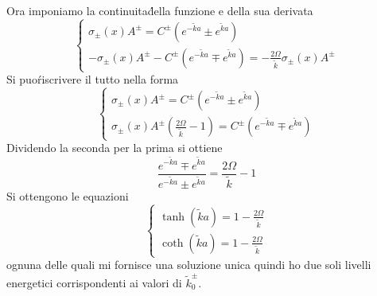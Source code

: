 \documentclass[a4paper]{article}
\begin{document}
        Ora imponiamo la continuita\' della funzione e della sua derivata 
        \begin{equation*}
            \begin{cases}
                \sigma_\pm(x)A^\pm=C^\pm \left(e^{-\tilde{k}a}\pm e^{\tilde{k}a}\right)\\
                -\sigma_\pm(x)A^\pm-C^\pm \left(e^{-\tilde{k}a}\mp e^{\tilde{k}a}\right)=-\frac{2\Omega}{\tilde{k}}\sigma_\pm(x)A^\pm
            \end{cases}
        \end{equation*}
        Si puo\' riscrivere il tutto nella forma
        \begin{equation*}
            \begin{cases}
                \sigma_\pm(x)A^\pm=C^\pm \left(e^{-\tilde{k}a}\pm e^{\tilde{k}a}\right)\\
                \sigma_\pm(x)A^\pm\left(\frac{2\Omega}{\tilde{k}}-1\right)=C^\pm \left(e^{-\tilde{k}a}\mp e^{\tilde{k}a}\right)
            \end{cases}
        \end{equation*}
        Dividendo la seconda per la prima si ottiene
        \begin{equation*}
            \frac{e^{-\tilde{k}a}\mp e^{\tilde{k}a}}{e^{-\tilde{k}a}\pm e^{\tilde{k}a}}=\frac{2\Omega}{\tilde{k}}-1
        \end{equation*}
        Si ottengono le equazioni
        \begin{equation*}
            \begin{cases}
                \tanh(\tilde{k}a)=1-\frac{2\Omega}{\tilde{k}}\\
                \coth(\tilde{k}a)=1-\frac{2\Omega}{\tilde{k}}
            \end{cases}
        \end{equation*}
        ognuna delle quali mi fornisce una soluzione unica quindi ho due soli livelli energetici corrispondenti ai valori di $\tilde{k}^\pm_0$.
        \begin{center}
        \end{center}
\end{document}
